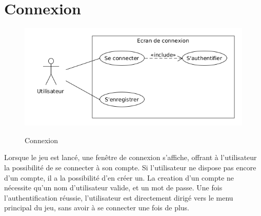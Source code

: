 \documentclass[../besoin_user.tex]{subfiles}
\begin{document}
\section{Connexion}
\begin{figure}[h]
    \centering
    \includegraphics[scale=0.6]{img_fonctionnel/use_case_user_connexion.png}
    \label{fig:user_connexion}
    \caption{Connexion}
\end{figure}
  Lorsque le jeu est lancé, une fenêtre de connexion s'affiche, offrant à l'utilisateur la possibilité de se connecter à son compte. 
  Si l'utilisateur ne dispose pas encore d'un compte, il a la possibilité d'en créer un. 
  La creation d'un compte ne nécessite qu'un nom d'utilisateur valide, et un mot de passe. 
  Une fois l'authentification réussie, l'utilisateur est directement dirigé vers le menu principal du jeu, sans avoir à se connecter une fois de plus.
  \newpage
\end{document}
